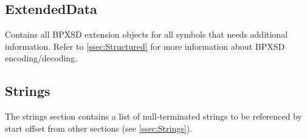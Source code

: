 \subsection{ExtendedData}
Contains all BPXSD extension objects for all symbols that needs additional information.\newline
Refer to \ref{ssec:Structured} for more information about BPXSD encoding/decoding.

\subsection{Strings}
The strings section contains a list of null-terminated strings to be referenced by start offset from other sections (see \ref{ssec:Strings}).